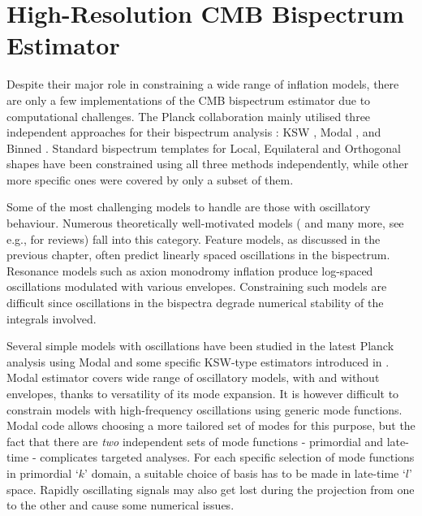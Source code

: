 \chapter{High-Resolution CMB Bispectrum Estimator} \label{chapter:high_resolution_cmb_bispectrum_estimator}

\ifpdf
    \graphicspath{{Chapter5/Figs/Raster/}{Chapter5/Figs/PDF/}{Chapter5/Figs/}}
\else
    \graphicspath{{Chapter5/Figs/Vector/}{Chapter5/Figs/}}
\fi

Despite their major role in constraining a wide range of inflation models, there are only a few implementations of the CMB bispectrum estimator due to computational challenges. The Planck collaboration mainly utilised three independent approaches for their bispectrum analysis \cite{PlanckCollaboration2013,PlanckCollaboration2015,PlanckCollaboration2018}: KSW \cite{Komatsu2005}, Modal \cite{Fergusson2012}, and Binned \cite{Bucher2010}. Standard bispectrum templates for Local, Equilateral and Orthogonal shapes have been constrained using all three methods independently, while other more specific ones were covered by only a subset of them.

Some of the most challenging models to handle are those with oscillatory behaviour. Numerous theoretically well-motivated models (\cite{Chen2010foldedResonant,Meerburg2009signatures,Meerburg2010nbd,Meerburg2011cutoff,Hazra2014} and many more, see e.g., \cite{Chen2010review,Chen2016} for reviews) fall into this category. Feature models, as discussed in the previous chapter, often predict linearly spaced oscillations in the bispectrum. Resonance models such as axion monodromy inflation \cite{Silverstein2008monodromy,Flauger2010monodromy} produce log-spaced oscillations modulated with various envelopes. Constraining such models are difficult since oscillations in the bispectra degrade numerical stability of the integrals involved.

Several simple models with oscillations have been studied in the latest Planck analysis using Modal and some specific KSW-type estimators introduced in \cite{Munchmeyer2014}. Modal estimator covers wide range of oscillatory models, with and without envelopes, thanks to versatility of its mode expansion. It is however difficult to constrain models with high-frequency oscillations using generic mode functions. Modal code allows choosing a more tailored set of modes for this purpose, but the fact that there are \textit{two} independent sets of mode functions - primordial and late-time - complicates targeted analyses. For each specific selection of mode functions in primordial `$k$' domain, a suitable choice of basis has to be made in late-time `$l$' space. Rapidly oscillating signals may also get lost during the projection from one to the other and cause some numerical issues.

